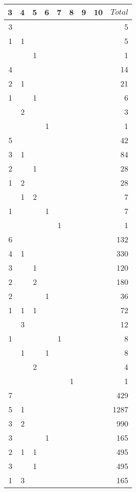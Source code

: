 \documentclass[10pt]{amsart}
\begin{document}
            \begin{table}[h]
            {\scriptsize \begin{tabular}{|rrrrrrrrr|} \hline
            3 & 4 & 5 & 6 & 7 & 8 & 9 & 10 & $Total$ \\ \hline
            3 &&&&&&&& 5 \\ 
            1 & 1 &&&&&&& 5 \\
            && 1 &&&&&& 1 \\ \hline
            4 &&&&&&&& 14 \\ 
            2 & 1 &&&&&&& 21 \\
            1 && 1 &&&&&& 6 \\ 
            & 2 &&&&&&& 3 \\
            &&& 1 &&&&& 1 \\ \hline
            5 &&&&&&&& 42 \\ 
            3 & 1 &&&&&&& 84 \\
            2 && 1 &&&&&& 28 \\
            1 & 2 &&&&&&& 28 \\
            & 1 & 2 &&&&&& 7 \\
            1 &&& 1 &&&&& 7 \\
            &&&& 1 &&&& 1 \\ \hline
            6 &&&&&&&& 132 \\
            4 & 1 &&&&&&& 330 \\
            3 && 1 &&&&&& 120 \\
            2 && 2 &&&&&& 180 \\
            2 &&& 1 &&&&& 36 \\
            1 & 1 & 1 &&&&&& 72 \\
            & 3 &&&&&&& 12 \\
            1 &&&& 1 &&&& 8 \\
            & 1 && 1 &&&&& 8 \\
            && 2 &&&&&& 4 \\ 
            &&&&& 1 &&& 1 \\ \hline
            7 &&&&&&&& 429 \\
            5 & 1 &&&&&&& 1287 \\ 
            3 & 2 &&&&&&& 990 \\
            3 &&& 1 &&&&& 165 \\
            2 & 1 & 1 &&&&&& 495 \\
            3 && 1 &&&&&& 495 \\
            1 & 3 &&&&&&& 165 \\

\end{tabular}}
\end{table}
\end{document}
